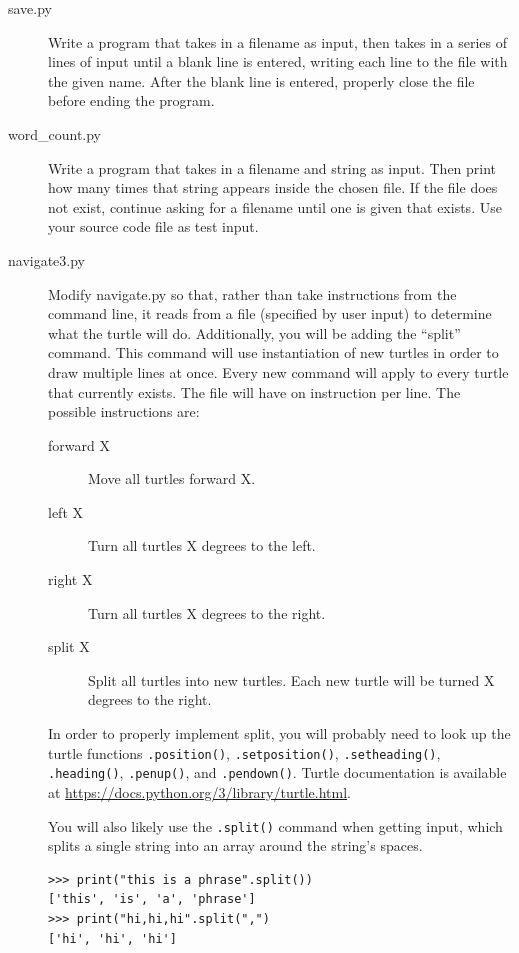 \documentclass[11pt]{cselabheader}
\begin{document}
\begin{description}
\item[save.py] Write a program that takes in a filename as input, then takes in
  a series of lines of input until a blank line is entered, writing each line to
  the file with the given name. After the blank line is entered, properly close
  the file before ending the program.  

\item[word\_count.py] Write a program that
  takes in a filename and string as input. Then print how many times that string
  appears inside the chosen file. If the file does not exist, continue asking
  for a filename until one is given that exists. Use your source code file as
  test input.

  \item[navigate3.py] Modify navigate.py so that, rather than take instructions
    from the command line, it reads from a file (specified by user input) to
    determine what the turtle will do. Additionally, you will be adding the
    ``split'' command. This command will use instantiation of new turtles in order
    to draw multiple lines at once. Every new command will apply to every turtle
    that currently exists. The file will have on instruction per line. The
    possible instructions are:

    \begin{description}
      \item[forward X] Move all turtles forward X.
      \item[left X] Turn all turtles X degrees to the left.
      \item[right X] Turn all turtles X degrees to the right.
      \item[split X] Split all turtles into new turtles. Each new turtle will be turned X degrees to the right.
    \end{description}

    In order to properly implement split, you will probably need to look up the
    turtle functions \lstinline{.position()}, \lstinline{.setposition()},
    \lstinline{.setheading()}, \lstinline{.heading()}, \lstinline{.penup()}, and
    \lstinline{.pendown()}. Turtle documentation is available at
    \url{https://docs.python.org/3/library/turtle.html}.

    You will also likely use the \lstinline{.split()} command when getting input, which splits a single string into an array around the string's spaces.
    \begin{lstlisting}[style=ipython]
>>> print("this is a phrase".split())
['this', 'is', 'a', 'phrase']
>>> print("hi,hi,hi".split(",")
['hi', 'hi', 'hi']
    \end{lstlisting}


\end{description}
\end{document}
